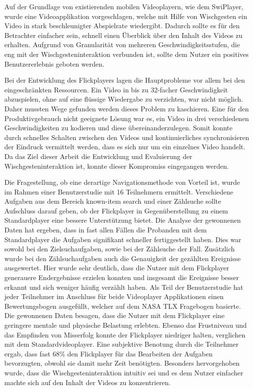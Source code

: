\documentclass[11pt,a4paper]{report}
\begin{document}
Auf der Grundlage von existierenden mobilen Videoplayern, wie dem SwiPlayer, wurde eine Videoapplikation vorgeschlagen, welche mit Hilfe von Wischgesten ein Video in stark beschleunigter Abspielrate wiedergibt. Dadurch sollte es für den Betrachter einfacher sein, schnell einen Überblick über den Inhalt des Videos zu erhalten. Aufgrund von Granularität von mehreren Geschwindigkeitsstufen, die eng mit der Wischgesteninteraktion verbunden ist, sollte dem Nutzer ein positives Benutzererlebnis geboten werden. 

Bei der Entwicklung des Flickplayers lagen die Hauptprobleme vor allem bei den eingeschränkten Ressourcen. Ein Video in bis zu 32-facher Geschwindigkeit abzuspielen, ohne auf eine flüssige Wiedergabe zu verzichten, war nicht möglich. Daher mussten Wege gefunden werden dieses Problem zu kaschieren. Eine für den Produktivgebrauch nicht geeignete Lösung war es, ein Video in drei verschiedenen Geschwindigkeiten zu kodieren und diese übereinanderzulegen. Somit konnte durch schnelles Schalten zwischen den Videos und kontinuierliches synchronisieren der Eindruck vermittelt werden, dass es sich nur um ein einzelnes Video handelt. Da das Ziel dieser Arbeit die Entwicklung und Evaluierung der Wischgesteninteraktion ist, konnte dieser Kompromiss eingegangen werden.

Die Fragestellung, ob eine derartige Navigationsmethode von Vorteil ist, wurde im Rahmen einer Benutzerstudie mit 16 Teilnehmern ermittelt. Verschiedene Aufgaben aus dem Bereich known-item search und einer Zählsuche sollte Aufschluss darauf geben, ob der Flickplayer in Gegenüberstellung zu einem Standardplayer eine bessere Unterstützung bietet. Die Analyse der gewonnenen Daten hat ergeben, dass in fast allen Fällen die Probanden mit dem Standardplayer die Aufgaben signifikant schneller fertiggestellt haben. Dies war sowohl bei den Zielsuchaufgaben, sowie bei der Zählsuche der Fall. Zusätzlich wurde bei den Zählsuchaufgaben auch die Genauigkeit der gezählten Ereignisse ausgewertet. Hier wurde sehr deutlich, dass die Nutzer mit dem Flickplayer generauere Endergebnisse erzielen konnten und insgesamt die Ereignisse besser erkannt und sich weniger häufig verzählt haben. Als Teil der Benutzerstudie hat jeder Teilnehmer im Anschluss für beide Videoplayer Applikationen einen Bewertungsbogen ausgefüllt, welcher auf dem NASA TLX Fragebogen basierte. Die gewonnenen Daten besagen, dass die Nutzer mit dem Flickplayer eine geringere mentale und physische Belastung erlebten. Ebenso das Frustniveau und das Empfinden von Misserfolg konnte der Flickplayer niedriger halten, verglichen mit dem Standardvideoplayer. Eine subjektive Benotung durch die Teilnehmer ergab, dass fast 68\% den Flickplayer für das Bearbeiten der Aufgaben bevorzugten, obwohl sie damit mehr Zeit benötigten. Besonders hervorgehoben wurde, dass die Wischgesteninteraktion intuitiv sei und es dem Nutzer einfacher machte sich auf den Inhalt der Videos zu konzentrieren.
\end{document}
